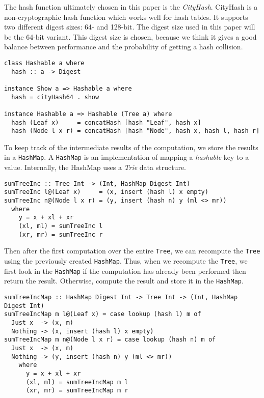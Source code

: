 The hash function ultimately chosen in this paper is the \textit{CityHash}\cite{hackage2022cityhash}. CityHash is a non-cryptographic hash function which works well for hash tables\cite{google2022cityhash}. It supports two different digest sizes: 64- and 128-bit. The digest size used in this paper will be the 64-bit variant. This digest size is chosen, because we think it gives a good balance between performance and the probability of getting a hash collision.

\begin{verbatim}
class Hashable a where
  hash :: a -> Digest

instance Show a => Hashable a where
  hash = cityHash64 . show

instance Hashable a => Hashable (Tree a) where
  hash (Leaf x)     = concatHash [hash "Leaf", hash x]
  hash (Node l x r) = concatHash [hash "Node", hash x, hash l, hash r]
\end{verbatim}

To keep track of the intermediate results of the computation, we store the results in a \texttt{HashMap}\cite{hackage2022hashmap}. A \texttt{HashMap} is an implementation of mapping a \textit{hashable} key to a value. Internally, the HashMap uses a \textit{Trie} data structure\cite*{fredkin1960trie}. 


\begin{verbatim}
sumTreeInc :: Tree Int -> (Int, HashMap Digest Int)
sumTreeInc l@(Leaf x)     = (x, insert (hash l) x empty)
sumTreeInc n@(Node l x r) = (y, insert (hash n) y (ml <> mr))
  where
    y = x + xl + xr
    (xl, ml) = sumTreeInc l
    (xr, mr) = sumTreeInc r
\end{verbatim}

Then after the first computation over the entire \texttt{Tree}, we can recompute the \texttt{Tree} using the previously created \texttt{HashMap}. Thus, when we recompute the \texttt{Tree}, we first look in the \texttt{HashMap} if the computation has already been performed then return the result. Otherwise, compute the result and store it in the \texttt{HashMap}.

\begin{verbatim}
sumTreeIncMap :: HashMap Digest Int -> Tree Int -> (Int, HashMap Digest Int)
sumTreeIncMap m l@(Leaf x) = case lookup (hash l) m of
  Just x  -> (x, m) 
  Nothing -> (x, insert (hash l) x empty)
sumTreeIncMap m n@(Node l x r) = case lookup (hash n) m of
  Just x  -> (x, m)
  Nothing -> (y, insert (hash n) y (ml <> mr))
    where
      y = x + xl + xr
      (xl, ml) = sumTreeIncMap m l
      (xr, mr) = sumTreeIncMap m r
\end{verbatim}

